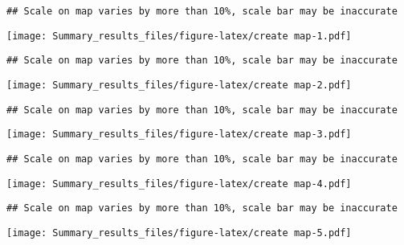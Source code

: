 \documentclass[
]{article}
\begin{document}
\begin{verbatim}
## Scale on map varies by more than 10%, scale bar may be inaccurate
\end{verbatim}

\texttt{[image: Summary\_results\_files/figure-latex/create map-1.pdf]}

\begin{verbatim}
## Scale on map varies by more than 10%, scale bar may be inaccurate
\end{verbatim}

\texttt{[image: Summary\_results\_files/figure-latex/create map-2.pdf]}

\begin{verbatim}
## Scale on map varies by more than 10%, scale bar may be inaccurate
\end{verbatim}

\texttt{[image: Summary\_results\_files/figure-latex/create map-3.pdf]}

\begin{verbatim}
## Scale on map varies by more than 10%, scale bar may be inaccurate
\end{verbatim}

\texttt{[image: Summary\_results\_files/figure-latex/create map-4.pdf]}

\begin{verbatim}
## Scale on map varies by more than 10%, scale bar may be inaccurate
\end{verbatim}

\texttt{[image: Summary\_results\_files/figure-latex/create map-5.pdf]}
\end{document}

